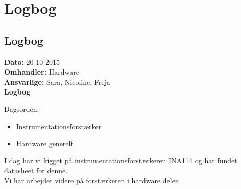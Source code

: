 \chapter{Logbog}
\section{Logbog}

\textbf{Dato:} 20-10-2015 \\
\textbf{Omhandler:} Hardware \\
\textbf{Ansvarlige:} Sara, Nicoline, Freja \\
\textbf{Logbog}

Dagsorden:
\begin{itemize}
	\item Instrumentationsforstærker
	\item Hardware generelt
\end{itemize}

I dag har vi kigget på instrumentationsforstærkeren INA114 og har fundet datasheet for denne.\\
Vi har arbejdet videre på forstærkeren i hardware delen\\
